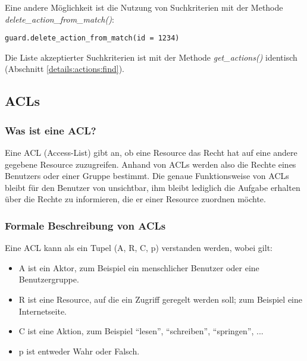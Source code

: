 Eine andere Möglichkeit ist die Nutzung von Suchkriterien mit der Methode 
{\it delete\_action\_from\_match()}:

\begin{lstlisting}
guard.delete_action_from_match(id = 1234)
\end{lstlisting}

Die Liste akzeptierter Suchkriterien ist mit der Methode {\it get\_actions()} 
identisch (Abschnitt \ref{details:actions:find}).


\subsection{ACLs}
\subsubsection{Was ist eine ACL?}

Eine ACL (Access-List) gibt an, ob eine Resource das Recht hat auf eine 
andere gegebene Resource zuzugreifen. Anhand von ACLs werden also die 
Rechte eines Benutzers oder einer Gruppe bestimmt. Die genaue 
Funktionsweise von ACLs bleibt für den Benutzer von \product unsichtbar, 
ihm bleibt lediglich die Aufgabe erhalten \product über die Rechte zu 
informieren, die er einer Resource zuordnen möchte.


\subsubsection{Formale Beschreibung von ACLs}

Eine ACL kann als ein Tupel (A, R, C, p) verstanden werden, wobei gilt:

\begin{itemize}
\item A ist ein Aktor, zum Beispiel ein menschlicher Benutzer oder 
eine Benutzergruppe.
\item R ist eine Resource, auf die ein Zugriff geregelt werden soll; zum 
Beispiel eine Internetseite.
\item C ist eine Aktion, zum Beispiel ``lesen'', ``schreiben'', ``springen'', ...
\item p ist entweder Wahr oder Falsch.
\end{itemize}


